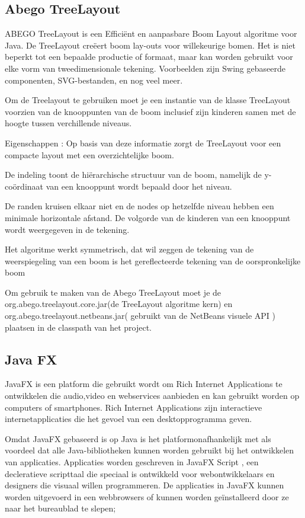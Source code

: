 \documentclass[pdftex,a4paper,12pt,twoside]{report}
\begin{document}
\subsection{Abego TreeLayout}
ABEGO TreeLayout is een Efficiënt en aanpasbare Boom Layout algoritme voor Java.
De TreeLayout creëert boom lay-outs voor willekeurige bomen. Het is niet beperkt tot een bepaalde productie of formaat, maar kan worden gebruikt voor elke vorm van tweedimensionale tekening. Voorbeelden zijn Swing gebaseerde componenten, SVG-bestanden, en nog veel meer.

Om de Treelayout te gebruiken moet je een instantie van de klasse TreeLayout voorzien van de knooppunten van de boom inclusief zijn kinderen samen met de hoogte tussen verchillende niveaus.

Eigenschappen :
Op basis van deze informatie zorgt de TreeLayout voor een compacte layout met een overzichtelijke boom.

De indeling toont de hiërarchische structuur van de boom, namelijk de y-coördinaat van een knooppunt wordt bepaald door het niveau.

De randen kruisen elkaar niet en de nodes op hetzelfde niveau hebben een minimale horizontale afstand.
De volgorde van de kinderen van een knooppunt wordt weergegeven in de tekening.

Het algoritme werkt symmetrisch, dat wil zeggen de tekening van de weerspiegeling van een boom is het gereflecteerde tekening van de oorspronkelijke boom


Om gebruik te maken van de Abego TreeLayout moet je de org.abego.treelayout.core.jar(de TreeLayout algoritme kern) en org.abego.treelayout.netbeans.jar( gebruikt  van de NetBeans visuele API ) plaatsen in de classpath van het project.


\subsection{Java FX}
JavaFX is een platform die gebruikt wordt om Rich Internet Applications te ontwikkelen die audio,video en webservices aanbieden en kan gebruikt worden op computers of smartphones.
Rich Internet Applications zijn interactieve internetapplicaties die het gevoel van een desktopprogramma geven.

Omdat JavaFX gebaseerd is op Java is het platformonafhankelijk met als voordeel dat alle Java-bibliotheken kunnen worden gebruikt bij het ontwikkelen van applicaties.
Applicaties worden geschreven in JavaFX Script , een decleratieve scripttaal die speciaal is ontwikkeld voor webontwikkelaars en designers die visuaal willen programmeren. 
De applicaties in JavaFX kunnen worden uitgevoerd in een webbrowsers of kunnen worden geïnstalleerd  door ze naar het bureaublad  te slepen;
\end{document}
